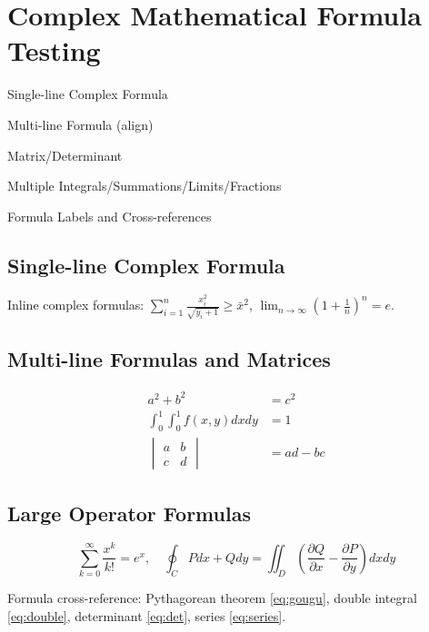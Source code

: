 \chapter{Complex Mathematical Formula Testing}
\begin{introduction}
\item Single-line Complex Formula
\item Multi-line Formula (align)
\item Matrix/Determinant
\item Multiple Integrals/Summations/Limits/Fractions
\item Formula Labels and Cross-references
\end{introduction}

\section{Single-line Complex Formula}
Inline complex formulas: $\sum_{i=1}^n \frac{x_i^2}{\sqrt{y_i+1}} \geq \bar{x}^2$, $\lim_{n\to\infty} \left(1+\frac{1}{n}\right)^n = e$.

\section{Multi-line Formulas and Matrices}
\begin{align}
a^2 + b^2 &= c^2 \label{eq:gougu} \\
\int_{0}^{1}\int_{0}^{1} f(x,y) dxdy &= 1 \label{eq:double} \\
\begin{vmatrix}
a & b \\
c & d
\end{vmatrix} &= ad-bc \label{eq:det}
\end{align}

\section{Large Operator Formulas}
\begin{equation}\label{eq:series}
\sum_{k=0}^{\infty} \frac{x^k}{k!} = e^x,\quad \oint_{C} Pdx+Qdy = \iint_{D}\left(\frac{\partial Q}{\partial x}-\frac{\partial P}{\partial y}\right)dxdy
\end{equation}

Formula cross-reference: Pythagorean theorem \eqref{eq:gougu}, double integral \eqref{eq:double}, determinant \eqref{eq:det}, series \eqref{eq:series}.

